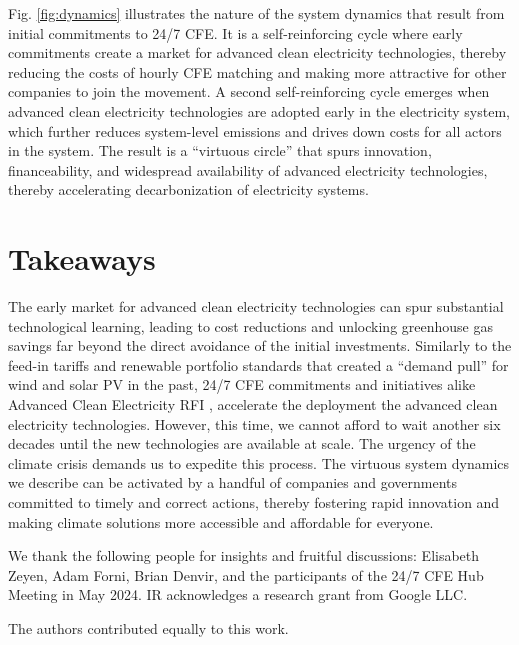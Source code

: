 \documentclass[pdflatex,sn-basic, Numbered]{sn-jnl}%
\theoremstyle{thmstyleone}%
\theoremstyle{thmstyletwo}%
\theoremstyle{thmstylethree}%
\begin{document}
Fig. \ref{fig:dynamics} illustrates the nature of the system dynamics that result from initial commitments to 24/7 CFE. It is a self-reinforcing cycle where early commitments create a market for advanced clean electricity technologies, thereby reducing the costs of hourly CFE matching and making more attractive for other companies to join the movement. A second self-reinforcing cycle emerges when advanced clean electricity technologies are adopted early in the electricity system, which further reduces system-level emissions and drives down costs for all actors in the system. The result is a \enquote{virtuous circle} that spurs innovation, financeability, and widespread availability of advanced electricity technologies, thereby accelerating decarbonization of electricity systems.

\section*{Takeaways}\label{sec6}

The early market for advanced clean electricity technologies can spur substantial technological learning, leading to cost reductions and unlocking greenhouse gas savings far beyond the direct avoidance of the initial investments. Similarly to the feed-in tariffs and renewable portfolio standards that created a \enquote{demand pull} for wind and solar PV in the past, 24/7 CFE commitments and initiatives alike Advanced Clean Electricity RFI \cite{GoogleMicrosoftNucor}, accelerate the deployment the advanced clean electricity technologies. However, this time, we cannot afford to wait another six decades until the new technologies are available at scale. The urgency of the climate crisis demands us to expedite this process. The virtuous system dynamics we describe can be activated by a handful of companies and governments committed to timely and correct actions, thereby fostering rapid innovation and making climate solutions more accessible and affordable for everyone.

\backmatter

 We thank the following people for insights and fruitful discussions: Elisabeth Zeyen, Adam Forni, Brian Denvir, and the participants of the 24/7 CFE Hub Meeting in May 2024. IR acknowledges a research grant from Google LLC.

 The authors contributed equally to this work.
\end{document}
